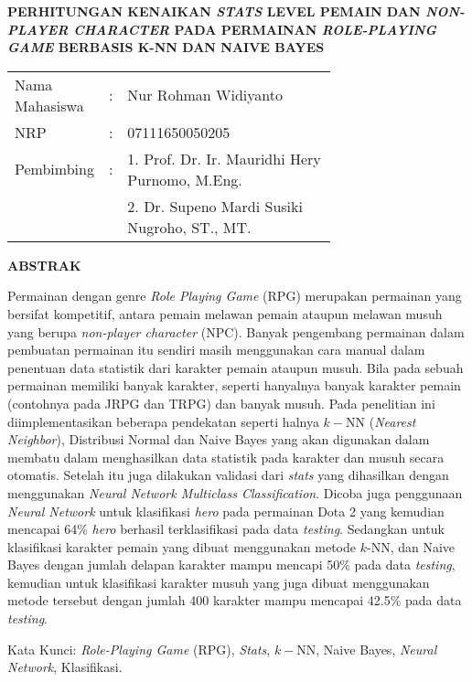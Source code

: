 \begin{spacing}{1}
	\begin{center}
		\large\textbf{PERHITUNGAN KENAIKAN \textit{STATS} LEVEL PEMAIN DAN \textit{NON-PLAYER CHARACTER} PADA PERMAINAN \textit{ROLE-PLAYING GAME} BERBASIS K-NN DAN NAIVE BAYES}
	\end{center}
	\vspace{2ex}
	
	\begin{adjustwidth}{-0.2cm}{}
		\begin{tabular}{lcp{0.7\linewidth}}
			Nama Mahasiswa &:& Nur Rohman Widiyanto \\
			NRP &:&	07111650050205 \\
			Pembimbing &:& 1. Prof. Dr. Ir. Mauridhi Hery Purnomo, M.Eng. \\
			& & 2. Dr. Supeno Mardi Susiki Nugroho, ST., MT. \\
		\end{tabular}
	\end{adjustwidth}
	\vspace{2ex}
	
	\begin{center}
		\large\textbf{ABSTRAK}
	\end{center}
	\vspace{1ex}
	
	Permainan dengan genre \textit{Role Playing Game} (RPG) merupakan permainan yang bersifat kompetitif, antara pemain melawan pemain ataupun melawan musuh yang berupa \textit{non-player character} (NPC). Banyak pengembang permainan dalam pembuatan permainan itu sendiri masih menggunakan cara manual dalam penentuan data statistik dari karakter pemain ataupun musuh. Bila pada sebuah permainan memiliki banyak karakter, seperti hanyalnya banyak karakter pemain (contohnya pada JRPG dan TRPG) dan banyak musuh. Pada penelitian ini diimplementasikan beberapa pendekatan seperti halnya $k-$NN (\textit{Nearest Neighbor}), Distribusi Normal dan Naive Bayes yang akan digunakan dalam membatu dalam menghasilkan data statistik pada karakter dan musuh secara otomatis. Setelah itu juga dilakukan validasi dari \textit{stats} yang dihasilkan dengan menggunakan \textit{Neural Network Multiclass Classification}. Dicoba juga penggunaan \textit{Neural Network} untuk klasifikasi \textit{hero} pada permainan Dota 2 yang kemudian mencapai 64\% \textit{hero} berhasil terklasifikasi pada data \textit{testing}. Sedangkan untuk klasifikasi karakter pemain yang dibuat menggunakan metode $k$-NN, dan Naive Bayes dengan jumlah delapan karakter mampu mencapi 50\% pada data \textit{testing}, kemudian untuk klasifikasi karakter musuh yang juga dibuat menggunakan metode tersebut dengan jumlah 400 karakter mampu mencapai 42.5\% pada data \textit{testing}.
	\vspace{2ex}
	

	Kata Kunci: \textit{Role-Playing Game} (RPG), \textit{Stats}, $k-$NN, Naive Bayes, \textit{Neural Network}, Klasifikasi.
\end{spacing}